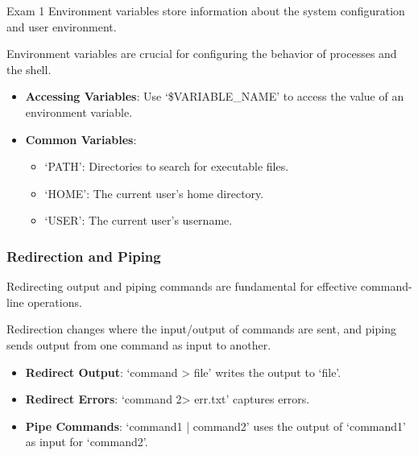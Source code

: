 \begin{examnotes}{Exam 1}
    Environment variables store information about the system configuration and user environment.
    
    \begin{highlight}
        Environment variables are crucial for configuring the behavior of processes and the shell.
        
        \begin{itemize}
            \item \textbf{Accessing Variables}: Use `\$VARIABLE\_NAME' to access the value of an environment variable.
            \item \textbf{Common Variables}:
                \begin{itemize}
                    \item `PATH': Directories to search for executable files.
                    \item `HOME': The current user's home directory.
                    \item `USER': The current user's username.
                \end{itemize}
        \end{itemize}
    \end{highlight}
    
    \subsubsection*{Redirection and Piping}
    
    Redirecting output and piping commands are fundamental for effective command-line operations.
    
    \begin{highlight}
        Redirection changes where the input/output of commands are sent, and piping sends output from one command as input to another.
        
        \begin{itemize}
            \item \textbf{Redirect Output}: `command > file' writes the output to `file'.
            \item \textbf{Redirect Errors}: `command 2> err.txt' captures errors.
            \item \textbf{Pipe Commands}: `command1 | command2' uses the output of `command1' as input for `command2'.
        \end{itemize}
    \end{highlight}
    

\end{examnotes}
